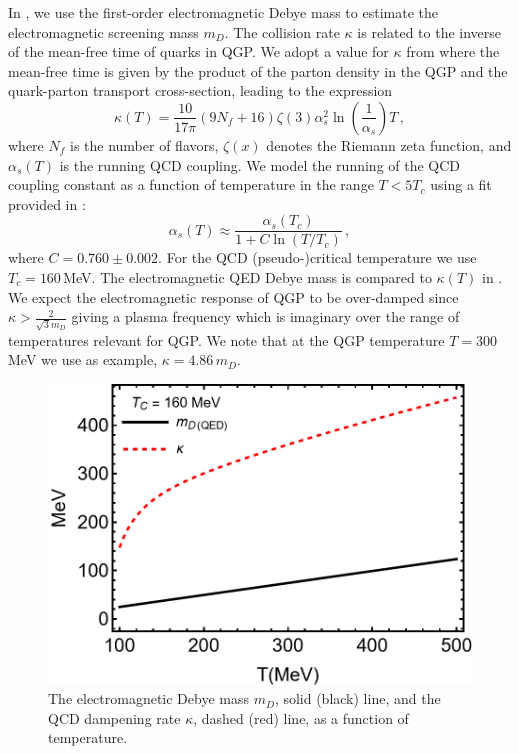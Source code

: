 In \cite{Grayson:2022asf}, we use the first-order electromagnetic Debye mass  to estimate the electromagnetic screening mass $m_D$. The collision rate $\kappa$ is related to the inverse of the mean-free time of quarks in QGP. We adopt a value for $\kappa$ from \cite{Mrowczynski:1988xu} where the mean-free time is given by the product of the parton density in the QGP and the quark-parton transport cross-section, leading to the expression 
\begin{equation}\label{eq:kappadef}
    \kappa(T) = \frac{10}{17\pi} (9 N_f +16) \zeta(3) \alpha_s^2 \ln\left(\frac{1}{\alpha_s}\right) T\,,
\end{equation}
where $N_f$ is the number of flavors, $\zeta(x)$ denotes the Riemann zeta function, and $\alpha_s(T)$ is the running QCD coupling.  We model the running of the QCD coupling constant as a function of temperature in the range $T<5T_c$ using a fit provided in \cite{Letessier:2002ony}:
\begin{equation}\label{eq:alphas}
    \alpha_s(T) \approx \frac{\alpha_s(T_c)}{1+C \ln(T/T_c)}\,,
\end{equation}
where $C=0.760 \pm 0.002$. For the QCD (pseudo-)critical temperature we use $T_c = 160\,$MeV. The  electromagnetic QED Debye mass is compared to $\kappa(T)$ in . We  expect the electromagnetic response of QGP to be over-damped since $\kappa> \frac{2}{\sqrt{3} m_D}$ giving a plasma frequency  which is imaginary over the range of temperatures relevant for QGP. We note that at the QGP temperature $T=300\,$MeV we use as example, $\kappa = 4.86\, m_D$.    

\begin{figure}
    \centering
    \includegraphics[width=0.7\linewidth]{plots/kappaDEBYE.png}
    \caption{The electromagnetic Debye mass $m_D$, solid (black) line, and the QCD dampening rate $\kappa$, dashed (red) line, as a function of temperature.  }
    \label{fig:kappaDebye}
\end{figure}



